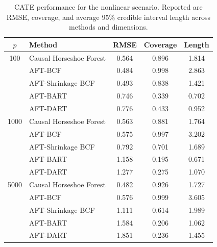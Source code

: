 \begin{table}[H]
\centering
\small
\renewcommand{\arraystretch}{0.9}
\begin{tabular}{clccc}
\toprule
$p$ & Method & RMSE & Coverage & Length \\
\midrule
100 & Causal Horseshoe Forest & 0.564 & 0.896 & 1.814 \\
  & AFT-BCF & 0.484 & 0.998 & 2.863 \\
  & AFT-Shrinkage BCF & 0.493 & 0.838 & 1.421 \\
  & AFT-BART & 0.746 & 0.339 & 0.702 \\
  & AFT-DART & 0.776 & 0.433 & 0.952 \\
\midrule
1000 & Causal Horseshoe Forest & 0.563 & 0.881 & 1.764 \\
  & AFT-BCF & 0.575 & 0.997 & 3.202 \\
  & AFT-Shrinkage BCF & 0.792 & 0.701 & 1.689 \\
  & AFT-BART & 1.158 & 0.195 & 0.671 \\
  & AFT-DART & 1.277 & 0.275 & 1.070 \\
\midrule
5000 & Causal Horseshoe Forest & 0.482 & 0.926 & 1.727 \\
  & AFT-BCF & 0.576 & 0.999 & 3.605 \\
  & AFT-Shrinkage BCF & 1.111 & 0.614 & 1.989 \\
  & AFT-BART & 1.584 & 0.206 & 1.062 \\
  & AFT-DART & 1.851 & 0.236 & 1.455 \\
\bottomrule
\end{tabular}
\caption{CATE performance for the nonlinear scenario. Reported are RMSE, coverage, and average 95\% credible interval length across methods and dimensions.}
\label{tab:main_nonlinear}
\end{table}

